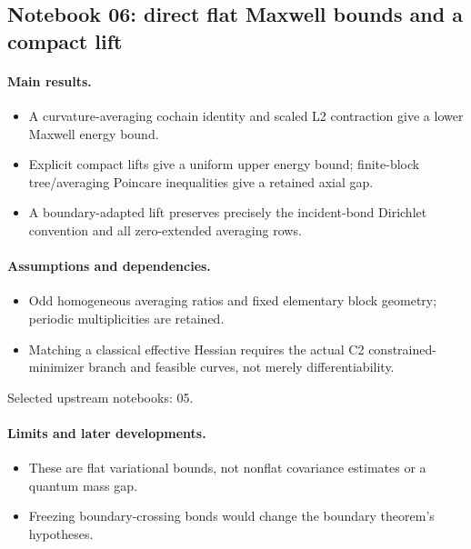 \subsection{Notebook 06: direct flat Maxwell bounds and a compact lift}
\label{hnc-06}
\noindent{}\par

\paragraph{Main results.}
\begin{itemize}
\item A curvature-averaging cochain identity and scaled L2 contraction give a lower Maxwell energy bound.
\item Explicit compact lifts give a uniform upper energy bound; finite-block tree/averaging Poincare inequalities give a retained axial gap.
\item A boundary-adapted lift preserves precisely the incident-bond Dirichlet convention and all zero-extended averaging rows.
\end{itemize}

\paragraph{Assumptions and dependencies.}
\begin{itemize}
\item Odd homogeneous averaging ratios and fixed elementary block geometry; periodic multiplicities are retained.
\item Matching a classical effective Hessian requires the actual C2 constrained-minimizer branch and feasible curves, not merely differentiability.
\end{itemize}

Selected upstream notebooks: 05.\par

\paragraph{Limits and later developments.}
\begin{itemize}
\item These are flat variational bounds, not nonflat covariance estimates or a quantum mass gap.
\item Freezing boundary-crossing bonds would change the boundary theorem's hypotheses.
\end{itemize}


